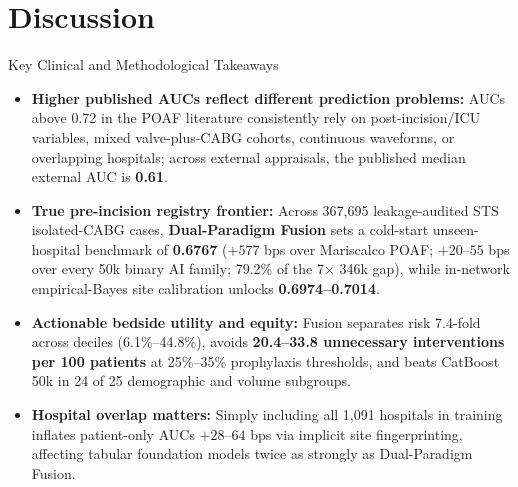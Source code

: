 \section{Discussion}
\label{sec:discussion}

\begin{clinicalbox}{Key Clinical and Methodological Takeaways}
\begin{itemize}[leftmargin=1.2em,itemsep=2pt,topsep=1pt]
  \item \textbf{Higher published AUCs reflect different prediction problems:} AUCs above 0.72 in the POAF literature consistently rely on post-incision/ICU variables, mixed valve-plus-CABG cohorts, continuous waveforms, or overlapping hospitals; across external appraisals, the published median external AUC is \textbf{0.61}.
  \item \textbf{True pre-incision registry frontier:} Across 367,695 leakage-audited STS isolated-CABG cases, \textbf{Dual-Paradigm Fusion} sets a cold-start unseen-hospital benchmark of \textbf{0.6767} ($+577$ bps over Mariscalco POAF; $+20$--$55$ bps over every 50k binary AI family; 79.2\% of the 7$\times$ 346k gap), while in-network empirical-Bayes site calibration unlocks \textbf{0.6974--0.7014}.
  \item \textbf{Actionable bedside utility and equity:} Fusion separates risk 7.4-fold across deciles (6.1\%--44.8\%), avoids \textbf{20.4--33.8 unnecessary interventions per 100 patients} at 25\%--35\% prophylaxis thresholds, and beats CatBoost 50k in 24 of 25 demographic and volume subgroups.
  \item \textbf{Hospital overlap matters:} Simply including all 1,091 hospitals in training inflates patient-only AUCs $+28$--$64$ bps via implicit site fingerprinting, affecting tabular foundation models twice as strongly as Dual-Paradigm Fusion.
\end{itemize}
\end{clinicalbox}

